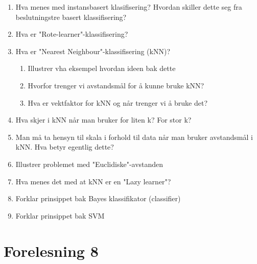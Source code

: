 		\begin{enumerate}
			\item Hva menes med instansbasert klasifisering? Hvordan skiller dette seg fra 
			beslutningstre basert klassifisering?
			\item Hva er "Rote-learner"-klassifisering?
			\item Hva er "Nearest Neighbour"-klassifisering (kNN)?
				\begin{enumerate}
					\item Illustrer vha eksempel hvordan ideen bak dette
					\item Hvorfor trenger vi avstandsmål for å kunne bruke kNN?
					\item Hva er vektfaktor for kNN og når trenger vi å bruke det?
				\end{enumerate}
			\item Hva skjer i kNN når man bruker for liten k? For stor k?
			\item Man må ta hensyn til skala i forhold til data når man bruker avstandsmål i kNN.
			Hva betyr egentlig dette?
			\item Illustrer problemet med "Euclidiske"-avstanden
			\item Hva menes det med at kNN er en "Lazy learner"?
			\item Forklar prinsippet bak Bayes klassifikator (classifier)
			\item Forklar prinsippet bak SVM
		\end{enumerate}

	\section{Forelesning 8}

